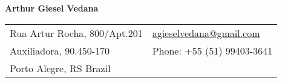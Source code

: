 \documentclass[letterpaper,11pt,oneside]{article}
\begin{document}

\noindent  \LARGE{\textbf{Arthur Giesel Vedana}}  \\
\vspace{-2ex}
\hline
\normalsize


\begin{center}
\begin{tabular}{l l}
 Rua Artur Rocha, 800/Apt.201    & \hspace{1in} \href{mailto:agieselvedana@gmail.com}{agieselvedana@gmail.com} \\
 Auxiliadora, 90.450-170    & \hspace{1in} Phone: +55 (51) 99403-3641  \\
 Porto Alegre, RS Brazil & \hspace{1in}  \\
\end{tabular}
\end{center}

\vspace{1em}

\end{document}
